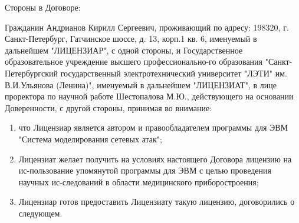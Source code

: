     Стороны в Договоре:

    Гражданин Андрианов Кирилл Сергеевич, проживающий по адресу: 198320, г. Санкт-Петербург, Гатчинское шоссе, д. 13, корп.1 кв. 6, именуемый в дальнейшем "ЛИЦЕНЗИАР", с одной стороны, и Государственное образовательное учреждение высшего профессионально-го образования "Санкт-Петербургский государственный электротехнический университет "ЛЭТИ" им. В.И.Ульянова (Ленина)", именуемый в дальнейшем "ЛИЦЕНЗИАТ", в лице проректора по научной работе Шестопалова М.Ю., действующего на основании Доверенности, с другой стороны, принимая во внимание:
\begin{enumerate}
    \item что Лицензиар является автором и правообладателем программы для ЭВМ "Система моделирования сетевых атак";
    \item Лицензиат желает получить на условиях настоящего Договора лицензию на ис-пользование упомянутой программы для ЭВМ с целью проведения научных ис-следований в области медицинского приборостроения;
    \item Лицензиар готов предоставить Лицензиату такую лицензию, договорились о следующем.
\end{enumerate}

